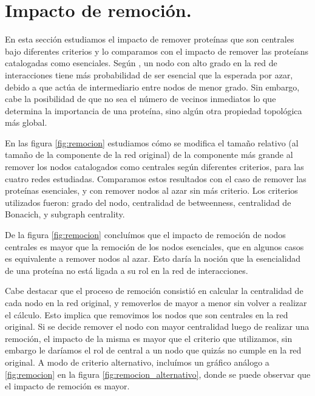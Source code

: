
\section{Impacto de remoción.}

\par En esta sección estudiamos el impacto de remover proteínas que son centrales bajo diferentes criterios y lo comparamos con el impacto de remover las proteíans catalogadas como esenciales. Según \cite{jeong2000}, un nodo con alto grado en la red de interacciones tiene más probabilidad de ser esencial que la esperada por azar, debido a que actúa de intermediario entre nodos de menor grado. Sin embargo, cabe la posibilidad de que no sea el número de vecinos inmediatos lo que determina la importancia de una proteína, sino algún otra propiedad topológica más global.
\par En las figura \ref{fig:remocion} estudiamos cómo se modifica el tamaño relativo (al tamaño de la componente de la red original) de la componente más grande al remover los nodos catalogados como centrales según diferentes criterios, para las cuatro redes estudiadas. Comparamos estos resultados con el caso de remover las proteínas esenciales, y con remover nodos al azar sin más criterio. Los criterios utilizados fueron: grado del nodo, centralidad de betweenness, centralidad de Bonacich, y subgraph centrality. 
\par De la figura \ref{fig:remocion} concluímos que el impacto de remoción de nodos centrales es mayor que la remoción de los nodos esenciales, que en algunos casos es equivalente a remover nodos al azar. Esto daría la noción que la esencialidad de una proteína no está ligada a su rol en la red de interacciones.
\par Cabe destacar que el proceso de remoción consistió en calcular la centralidad de cada nodo en la red original, y removerlos de mayor a menor sin volver a realizar el cálculo. Esto implica que removimos los nodos que son centrales en la red original. Si se decide remover el nodo con mayor centralidad luego de realizar una remoción, el impacto de la misma es mayor que el criterio que utilizamos, sin embargo le daríamos el rol de central a un nodo que quizás no cumple en la red original. A modo de criterio alternativo, incluímos un gráfico análogo a \ref{fig:remocion} en la figura \ref{fig:remocion_alternativo}, donde se puede observar que el impacto de remoción es mayor.
 

